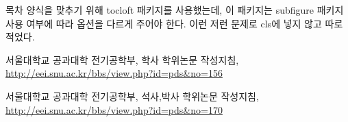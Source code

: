 \documentclass[a4paper]{report}
\begin{document}
목차 양식을 맞추기 위해 tocloft 패키지를 사용했는데,
이 패키지는
subfigure 패키지 사용 여부에 따라 옵션을 다르게 주어야 한다.
이런 저런 문제로 cls에 넣지 않고 따로 적었다.

\begin{thebibliography}{00}

 서울대학교 공과대학 전기공학부,
학사 학위논문 작성지침,
\url{http://eei.snu.ac.kr/bbs/view.php?id=pds&no=156}

 서울대학교 공과대학 전기공학부,
석사,박사 학위논문 작성지침,
\url{http://eei.snu.ac.kr/bbs/view.php?id=pds&no=170}

\end{thebibliography}
\end{document}
